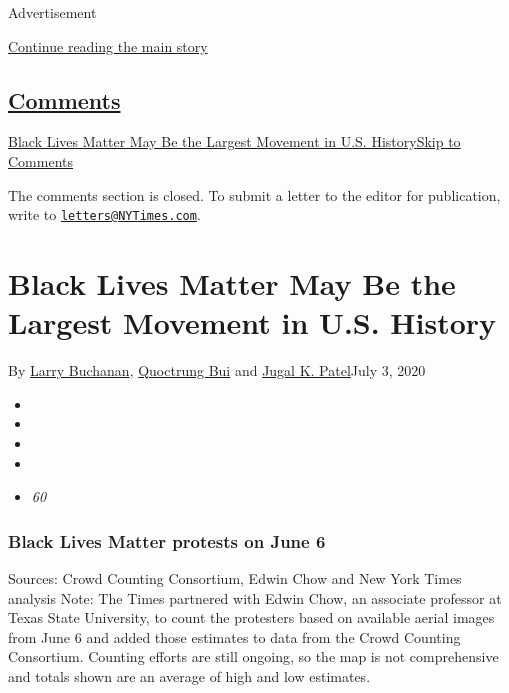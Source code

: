 Advertisement

\protect\hyperlink{after-top}{Continue reading the main story}

\hypertarget{comments}{%
\subsection{\texorpdfstring{\protect\hyperlink{commentsContainer}{Comments}}{Comments}}\label{comments}}

\href{}{Black Lives Matter May Be the Largest Movement in U.S.
History}\href{}{Skip to Comments}

The comments section is closed. To submit a letter to the editor for
publication, write to
\href{mailto:letters@NYTimes.com}{\nolinkurl{letters@NYTimes.com}}.

\hypertarget{black-lives-matter-may-be-the-largest-movement-in-us-history}{%
\section{Black Lives Matter May Be the Largest Movement in U.S.
History}\label{black-lives-matter-may-be-the-largest-movement-in-us-history}}

By \href{https://www.nytimes3xbfgragh.onion/by/larry-buchanan}{Larry
Buchanan},
\href{https://www.nytimes3xbfgragh.onion/by/quoctrung-bui}{Quoctrung
Bui} and
\href{https://www.nytimes3xbfgragh.onion/by/jugal-k-patel}{Jugal K.
Patel}July 3, 2020

\begin{itemize}
\item
\item
\item
\item
\item
  \emph{60}
\end{itemize}

\hypertarget{black-lives-matter-protests-on-june-6}{%
\subsubsection{Black Lives Matter protests on June
6}\label{black-lives-matter-protests-on-june-6}}

Sources: Crowd Counting Consortium, Edwin Chow and New York Times
analysis \textbar{} Note: The Times partnered with Edwin Chow, an
associate professor at Texas State University, to count the protesters
based on available aerial images from June 6 and added those estimates
to data from the Crowd Counting Consortium. Counting efforts are still
ongoing, so the map is not comprehensive and totals shown are an average
of high and low estimates.

